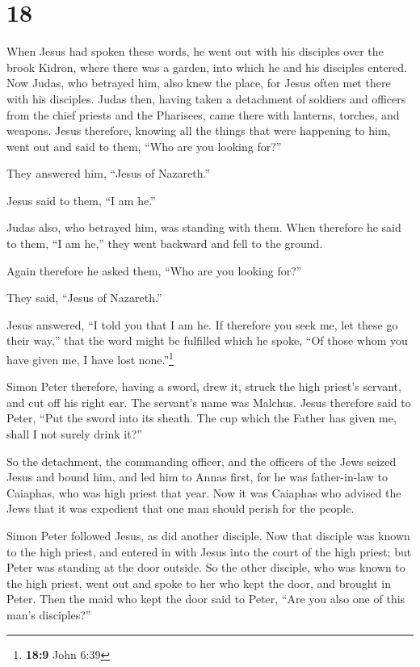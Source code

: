 \hypertarget{section-17}{%
\section{18}\label{section-17}}

 When Jesus had spoken these words, he went out with his
disciples over the brook Kidron, where there was a garden, into which he
and his disciples entered.  Now Judas, who betrayed him,
also knew the place, for Jesus often met there with his disciples.
 Judas then, having taken a detachment of soldiers and
officers from the chief priests and the Pharisees, came there with
lanterns, torches, and weapons.  Jesus therefore, knowing
all the things that were happening to him, went out and said to them,
``Who are you looking for?''

 They answered him, ``Jesus of Nazareth.''

Jesus said to them, ``I am he.''

Judas also, who betrayed him, was standing with them. 
When therefore he said to them, ``I am he,'' they went backward and fell
to the ground.

 Again therefore he asked them, ``Who are you looking
for?''

They said, ``Jesus of Nazareth.''

 Jesus answered, ``I told you that I am he. If therefore
you seek me, let these go their way,''  that the word
might be fulfilled which he spoke, ``Of those whom you have given me, I
have lost none.''\footnote{\textbf{18:9} John 6:39}

 Simon Peter therefore, having a sword, drew it, struck
the high priest's servant, and cut off his right ear. The servant's name
was Malchus.  Jesus therefore said to Peter, ``Put the
sword into its sheath. The cup which the Father has given me, shall I
not surely drink it?''

 So the detachment, the commanding officer, and the
officers of the Jews seized Jesus and bound him,  and led
him to Annas first, for he was father-in-law to Caiaphas, who was high
priest that year.  Now it was Caiaphas who advised the
Jews that it was expedient that one man should perish for the people.

 Simon Peter followed Jesus, as did another disciple. Now
that disciple was known to the high priest, and entered in with Jesus
into the court of the high priest;  but Peter was
standing at the door outside. So the other disciple, who was known to
the high priest, went out and spoke to her who kept the door, and
brought in Peter.  Then the maid who kept the door said
to Peter, ``Are you also one of this man's disciples?''

